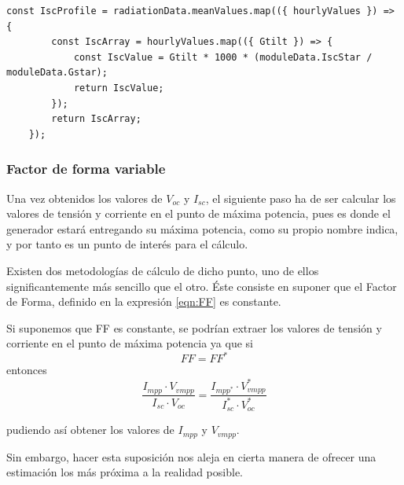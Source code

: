 \begin{lstlisting}[style=ES6, caption={Cálculo de la corriente de cortocircuito}]
	const IscProfile = radiationData.meanValues.map(({ hourlyValues }) => {
		const IscArray = hourlyValues.map(({ Gtilt }) => {
			const IscValue = Gtilt * 1000 * (moduleData.IscStar / moduleData.Gstar);
			return IscValue;
		});
		return IscArray;
	});
\end{lstlisting}

\subsubsection{Factor de forma variable}
\label{section:var_form_factor}

Una vez obtenidos los valores de $V_{oc}$ y $I_{sc}$, el siguiente paso ha de ser calcular los valores de tensión y corriente en el punto de máxima potencia, pues es donde el generador estará entregando su máxima potencia, como su propio nombre indica, y por tanto es un punto de interés para el cálculo.

Existen dos metodologías de cálculo de dicho punto, uno de ellos significantemente más sencillo que el otro. Éste consiste en suponer que el Factor de Forma, definido en la expresión \ref{eqn:FF} es constante.

Si suponemos que FF es constante, se podrían extraer los valores de tensión y corriente en el punto de máxima potencia ya que si
\begin{equation}
FF = FF^*
\end{equation}
entonces
\begin{equation}
\frac{I_{mpp} \cdot V_{vmpp}}{I_{sc} \cdot V_{oc}} = \frac{I_{mpp^*} \cdot V_{vmpp}^*}{I_{sc}^* \cdot V_{oc}^*}
\end{equation}

pudiendo así obtener los valores de $I_{mpp}$ y $V_{vmpp}$.

Sin embargo, hacer esta suposición nos aleja en cierta manera de ofrecer una estimación los más próxima a la realidad posible.

